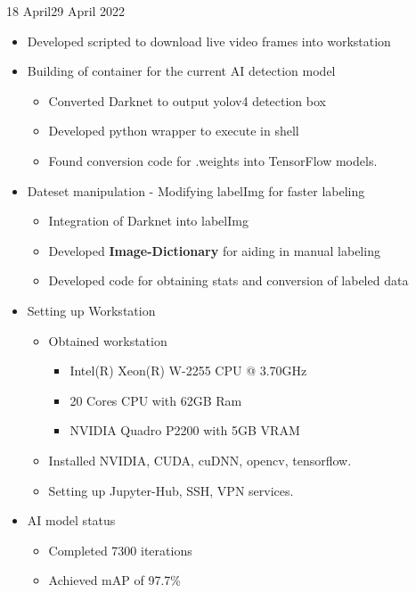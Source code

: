 \documentclass{diaryformat}
\begin{document}
\begin{workDone}{18 April}{29 April 2022}
	\begin{itemize}
		\item Developed scripted to download live video frames into workstation
		\item Building of container for the current AI detection model
		\begin{itemize}
			\item Converted Darknet to output yolov4 detection box
			\item Developed python wrapper to execute in shell
			\item Found conversion code for .weights into TensorFlow models.
		\end{itemize}
		\item Dateset manipulation - Modifying labelImg for faster labeling
		\begin{itemize}
			\item Integration of Darknet into labelImg
			\item Developed \textbf{Image-Dictionary} for aiding in manual labeling
			\item Developed code for obtaining stats and conversion of labeled data
		\end{itemize}
	
		\item Setting up Workstation
		\begin{itemize}
			\item Obtained workstation
			\begin{itemize}
				\item Intel(R) Xeon(R) W-2255 CPU @ 3.70GHz
				\item 20 Cores CPU with 62GB Ram
				\item NVIDIA Quadro P2200 with 5GB VRAM
			\end{itemize}
			
			\item Installed NVIDIA, CUDA, cuDNN, opencv, tensorflow.
			\item Setting up Jupyter-Hub, SSH, VPN services.
		\end{itemize}
		\item AI model status
		\begin{itemize}
			\item Completed 7300 iterations
			\item Achieved mAP of 97.7\%
		\end{itemize}
	\end{itemize}
\end{workDone}
\end{document}
